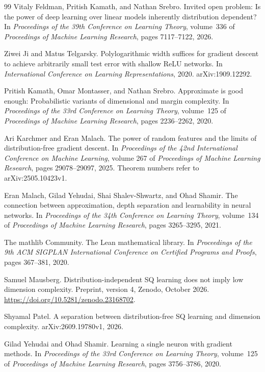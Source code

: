 \documentclass[11pt,letterpaper,pmlr,twoside]{jmlr}
\begin{document}
\begin{thebibliography}{99}
Vitaly Feldman, Pritish Kamath, and Nathan Srebro.
\newblock Invited open problem: Is the power of deep learning over linear models inherently distribution dependent?
\newblock In \emph{Proceedings of the 39th Conference on Learning Theory}, volume~336 of \emph{Proceedings of Machine Learning Research}, pages 7117--7122, 2026.

Ziwei Ji and Matus Telgarsky.
\newblock Polylogarithmic width suffices for gradient descent to achieve arbitrarily small test error with shallow {ReLU} networks.
\newblock In \emph{International Conference on Learning Representations}, 2020.
\newblock arXiv:1909.12292.

Pritish Kamath, Omar Montasser, and Nathan Srebro.
\newblock Approximate is good enough: Probabilistic variants of dimensional and margin complexity.
\newblock In \emph{Proceedings of the 33rd Conference on Learning Theory}, volume~125 of \emph{Proceedings of Machine Learning Research}, pages 2236--2262, 2020.

Ari Karchmer and Eran Malach.
\newblock The power of random features and the limits of distribution-free gradient descent.
\newblock In \emph{Proceedings of the 42nd International Conference on Machine Learning}, volume 267 of \emph{Proceedings of Machine Learning Research}, pages 29078--29097, 2025.
\newblock Theorem numbers refer to arXiv:2505.10423v1.

Eran Malach, Gilad Yehudai, Shai Shalev-Shwartz, and Ohad Shamir.
\newblock The connection between approximation, depth separation and learnability in neural networks.
\newblock In \emph{Proceedings of the 34th Conference on Learning Theory}, volume~134 of \emph{Proceedings of Machine Learning Research}, pages 3265--3295, 2021.

{The mathlib Community}.
\newblock The {L}ean mathematical library.
\newblock In \emph{Proceedings of the 9th ACM SIGPLAN International Conference on Certified Programs and Proofs}, pages 367--381, 2020.

Samuel Mausberg.
\newblock Distribution-independent {SQ} learning does not imply low dimension complexity.
\newblock Preprint, version 4, Zenodo, October 2026.
\newblock \url{https://doi.org/10.5281/zenodo.23168702}.

Shyamal Patel.
\newblock A separation between distribution-free {SQ} learning and dimension complexity.
\newblock arXiv:2609.19780v1, 2026.

Gilad Yehudai and Ohad Shamir.
\newblock Learning a single neuron with gradient methods.
\newblock In \emph{Proceedings of the 33rd Conference on Learning Theory}, volume~125 of \emph{Proceedings of Machine Learning Research}, pages 3756--3786, 2020.
\end{thebibliography}
\end{document}
